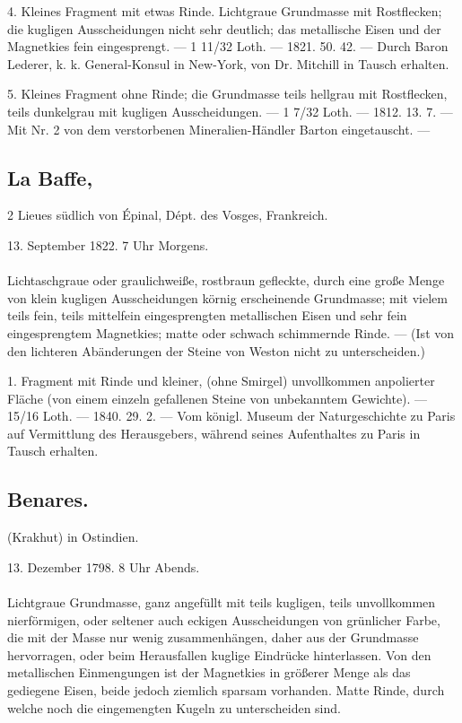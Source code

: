 \documentclass[a4paper, 11pt, oneside, polutonikogreek, german]{article}
\begin{document}
4. Kleines Fragment mit etwas Rinde. Lichtgraue Grundmasse mit Rostflecken; die kugligen Ausscheidungen nicht sehr deutlich; das metallische Eisen und der Magnetkies fein eingesprengt. — 1 11/32 Loth. — 1821. 50. 42. — Durch Baron Lederer, k. k. General-Konsul in New-York, von Dr. Mitchill in Tausch erhalten.

5. Kleines Fragment ohne Rinde; die Grundmasse teils hellgrau mit Rostflecken, teils dunkelgrau mit kugligen Ausscheidungen. — 1 7/32 Loth. — 1812. 13. 7. — Mit Nr. 2 von dem verstorbenen Mineralien-Händler Barton eingetauscht. —
\subsection[La Baffe.]{La Baffe,}
\begin{center}
\small
2 Lieues südlich von Épinal, Dépt. des Vosges, Frankreich.

13. September 1822. 7 Uhr Morgens.
\end{center}
\paragraph{}
Lichtaschgraue oder graulichweiße, rostbraun gefleckte, durch eine große Menge von klein kugligen Ausscheidungen körnig erscheinende Grundmasse; mit vielem teils fein, teils mittelfein eingesprengten metallischen Eisen und sehr fein eingesprengtem Magnetkies; matte oder schwach schimmernde Rinde. — (Ist von den lichteren Abänderungen der Steine von Weston nicht zu unterscheiden.)

1. Fragment mit Rinde und kleiner, (ohne Smirgel) unvollkommen anpolierter Fläche (von einem einzeln gefallenen Steine von unbekanntem Gewichte). — 15/16 Loth. — 1840. 29. 2. — Vom königl. Museum der Naturgeschichte zu Paris auf Vermittlung des Herausgebers, während seines Aufenthaltes zu Paris in Tausch erhalten.
\subsection{Benares.}
\begin{center}
\small
(Krakhut) in Ostindien.

13. Dezember 1798. 8 Uhr Abends.
\end{center}
\paragraph{}
Lichtgraue Grundmasse, ganz angefüllt mit teils kugligen, teils unvollkommen nierförmigen, oder seltener auch eckigen Ausscheidungen von grünlicher Farbe, die mit der Masse nur wenig zusammenhängen, daher aus der Grundmasse hervorragen, oder beim Herausfallen kuglige Eindrücke hinterlassen. Von den metallischen Einmengungen ist der Magnetkies in größerer Menge als das gediegene Eisen, beide jedoch ziemlich sparsam vorhanden. Matte Rinde, durch welche noch die eingemengten Kugeln zu unterscheiden sind.
\end{document}
